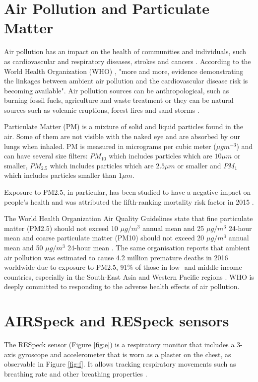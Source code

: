 \section{Air Pollution and Particulate Matter}

Air pollution has an impact on the health of communities and individuals, such as cardiovascular and respiratory diseases, strokes and cancers \cite{scor}. According to the World Health Organization (WHO) \cite{whofactsheet}, "more and more, evidence demonstrating the linkages between ambient air pollution and the cardiovascular disease risk is becoming available". Air pollution sources can be anthropological, such as burning fossil fuels, agriculture and waste treatment or they can be natural sources such as volcanic eruptions, forest fires and sand storms \cite{signals}.

Particulate Matter (PM) is a mixture of solid and liquid particles found in the air. Some of them are not visible with the naked eye and are absorbed by our lungs when inhaled. PM is measured in micrograms per cubic meter ($\mu g m^{-3}$) and can have several size filters: $PM_{10}$ which includes particles which are $10\mu m$ or smaller, $PM_{2.5}$ which includes particles which are $2.5\mu m$ or smaller and  $PM_1$ which includes particles smaller than $1\mu m$.

Exposure to PM2.5, in particular, has been studied to have a negative impact on people's health and was attributed the fifth-ranking mortality risk factor in 2015 \cite{lancet}.

The World Health Organization Air Quality Guidelines state that fine particulate matter (PM2.5) should not exceed 10 $\mu g/m^3$ annual mean and 25 $\mu g/m^3$ 24-hour mean and coarse particulate matter (PM10) should not exceed 20 $\mu g/m^3$ annual mean and 50 $\mu g/m^3$ 24-hour mean \cite{whofactsheet}. The same organisation reports that ambient air pollution was estimated to cause 4.2 million premature deaths in 2016 worldwide due to exposure to PM2.5, 91\% of those in low- and middle-income countries, especially in the South-East Asia and Western Pacific regions \cite{whofactsheet}. WHO is deeply committed to responding to the adverse health effects of air pollution. 


\section{AIRSpeck and RESpeck sensors}

The RESpeck sensor (Figure \ref{fig:e}) is a respiratory monitor that includes a 3-axis gyroscope and accelerometer that is worn as a plaster on the chest, as observable in Figure \ref{fig:f}. It allows tracking respiratory movements such as breathing rate and other breathing properties \cite{estimation_dosage}. 

